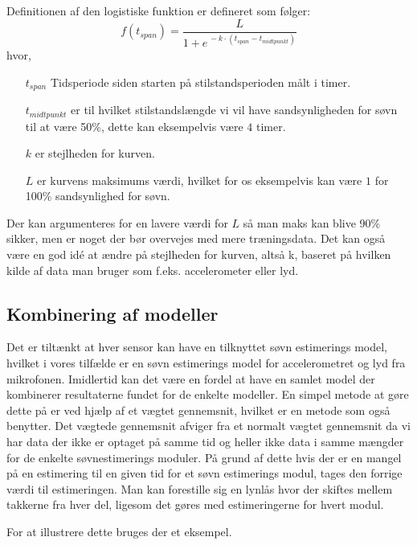 Definitionen af den logistiske funktion er defineret som følger:
\begin{equation}
	f(t_{span}) = \frac{L}{1+e^{\,-k\cdot(t_{span} - t_{midtpunkt})}}
\end{equation} 
hvor,
\begin{itemize}
	\item[$t_{span}$] Tidsperiode siden starten på stilstandsperioden målt i timer.
	\item[$t_{midtpunkt}$] er til hvilket stilstandslængde vi vil have sandsynligheden for søvn til at være 50\%, dette kan eksempelvis være $4$ timer.
	\item[$k$] er stejlheden for kurven.
	\item[$L$] er kurvens maksimums værdi, hvilket for os eksempelvis kan være $1$ for 100\% sandsynlighed for søvn.
\end{itemize}

Der kan argumenteres for en lavere værdi for $L$ så man maks kan blive 90\% sikker, men er noget der bør overvejes med mere træningsdata. Det kan også være en god idé at ændre på stejlheden for kurven, altså k, baseret på hvilken kilde af data man bruger som f.eks. accelerometer eller lyd.

\subsection{Kombinering af modeller}\label{subsec:kombimodeller}
Det er tiltænkt at hver sensor kan have en tilknyttet søvn estimerings model, hvilket i vores tilfælde er en søvn estimerings model for accelerometret og lyd fra mikrofonen.
Imidlertid kan det være en fordel at have en samlet model der kombinerer resultaterne fundet for de enkelte modeller.
En simpel metode at gøre dette på er ved hjælp af et vægtet gennemsnit, hvilket er en metode som \citet{6563918} også benytter.
Det vægtede gennemsnit afviger fra et normalt vægtet gennemsnit da vi har data der ikke er optaget på samme tid og heller ikke data i samme mængder for de enkelte søvnestimerings moduler.
På grund af dette hvis der er en mangel på en estimering til en given tid for et søvn estimerings modul, tages den forrige værdi til estimeringen.
Man kan forestille sig en lynlås hvor der skiftes mellem takkerne fra hver del, ligesom det gøres med estimeringerne for hvert modul.

For at illustrere dette bruges der et eksempel.

\newcommand{\nv}{Ingen estimering}

